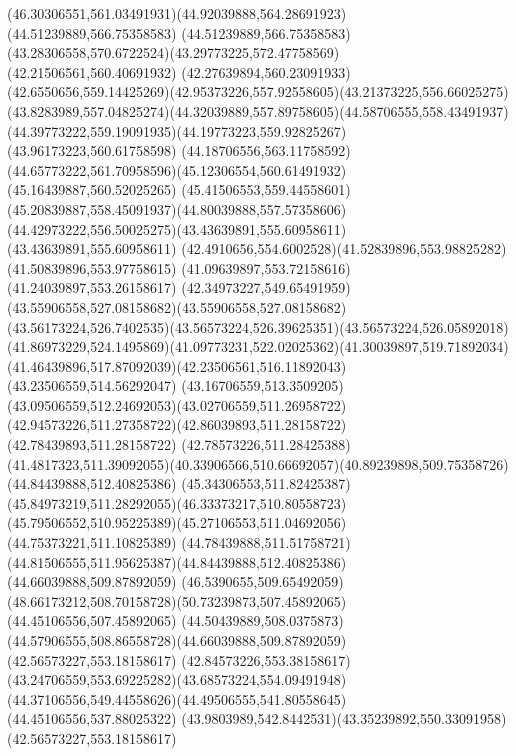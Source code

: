 {{\curveto(46.30306551,561.03491931)(44.92039888,564.28691923)(44.51239889,566.75358583)
\curveto(44.51239889,566.75358583)(43.28306558,570.6722524)(43.29773225,572.47758569)
\lineto(42.21506561,560.40691932)
\lineto(42.27639894,560.23091933)
\curveto(42.6550656,559.14425269)(42.95373226,557.92558605)(43.21373225,556.66025275)
\curveto(43.8283989,557.04825274)(44.32039889,557.89758605)(44.58706555,558.43491937)
\curveto(44.39773222,559.19091935)(44.19773223,559.92825267)(43.96173223,560.61758598)
\lineto(44.18706556,563.11758592)
\curveto(44.65773222,561.70958596)(45.12306554,560.61491932)(45.16439887,560.52025265)
\curveto(45.41506553,559.44558601)(45.20839887,558.45091937)(44.80039888,557.57358606)
\curveto(44.42973222,556.50025275)(43.43639891,555.60958611)(43.43639891,555.60958611)
\curveto(42.4910656,554.6002528)(41.52839896,553.98825282)(41.50839896,553.97758615)
\lineto(41.09639897,553.72158616)
\lineto(41.24039897,553.26158617)
\curveto(42.34973227,549.65491959)(43.55906558,527.08158682)(43.55906558,527.08158682)
\curveto(43.56173224,526.7402535)(43.56573224,526.39625351)(43.56573224,526.05892018)
\curveto(41.86973229,524.1495869)(41.09773231,522.02025362)(41.30039897,519.71892034)
\curveto(41.46439896,517.87092039)(42.23506561,516.11892043)(43.23506559,514.56292047)
\curveto(43.16706559,513.3509205)(43.09506559,512.24692053)(43.02706559,511.26958722)
\curveto(42.94573226,511.27358722)(42.86039893,511.28158722)(42.78439893,511.28158722)
\lineto(42.78573226,511.28425388)
\curveto(41.4817323,511.39092055)(40.33906566,510.66692057)(40.89239898,509.75358726)
\moveto(44.84439888,512.40825386)
\curveto(45.34306553,511.82425387)(45.84973219,511.28292055)(46.33373217,510.80558723)
\curveto(45.79506552,510.95225389)(45.27106553,511.04692056)(44.75373221,511.10825389)
\curveto(44.78439888,511.51758721)(44.81506555,511.95625387)(44.84439888,512.40825386)
\moveto(44.66039888,509.87892059)
\curveto(46.5390655,509.65492059)(48.66173212,508.70158728)(50.73239873,507.45892065)
\lineto(44.45106556,507.45892065)
\curveto(44.50439889,508.0375873)(44.57906555,508.86558728)(44.66039888,509.87892059)
\moveto(42.56573227,553.18158617)
\curveto(42.84573226,553.38158617)(43.24706559,553.69225282)(43.68573224,554.09491948)
\curveto(44.37106556,549.44558626)(44.49506555,541.80558645)(44.45106556,537.88025322)
\curveto(43.9803989,542.8442531)(43.35239892,550.33091958)(42.56573227,553.18158617)
}
}


